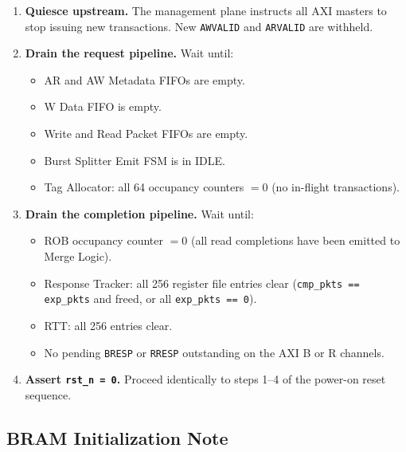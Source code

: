 \begin{enumerate}
  \item \textbf{Quiesce upstream.}
        The management plane instructs all AXI masters to stop issuing new
        transactions. New \texttt{AWVALID} and \texttt{ARVALID} are withheld.

  \item \textbf{Drain the request pipeline.}
        Wait until:
        \begin{itemize}
          \item AR and AW Metadata FIFOs are empty.
          \item W Data FIFO is empty.
          \item Write and Read Packet FIFOs are empty.
          \item Burst Splitter Emit FSM is in \textsc{IDLE}.
          \item Tag Allocator: all 64 occupancy counters $= 0$ (no in-flight transactions).
        \end{itemize}

  \item \textbf{Drain the completion pipeline.}
        Wait until:
        \begin{itemize}
          \item ROB occupancy counter $= 0$ (all read completions have been
                emitted to Merge Logic).
          \item Response Tracker: all 256 register file entries clear
                (\texttt{cmp\_pkts == exp\_pkts} and freed, or all
                \texttt{exp\_pkts == 0}).
          \item RTT: all 256 entries clear.
          \item No pending \texttt{BRESP} or \texttt{RRESP} outstanding on the
                AXI B or R channels.
        \end{itemize}

  \item \textbf{Assert \texttt{rst\_n = 0}.}
        Proceed identically to steps 1--4 of the power-on reset sequence.

\end{enumerate}

\subsection{BRAM Initialization Note}


